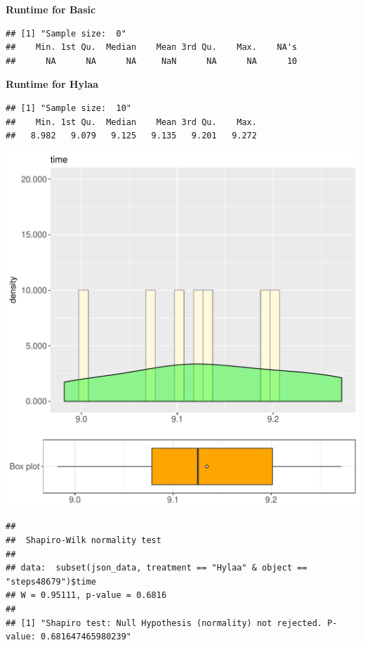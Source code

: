 \documentclass{article}\usepackage[]{graphicx}\usepackage[]{color}
\makeatletter
\def\maxwidth{ %
  \ifdim\Gin@nat@width>\linewidth
    \linewidth
  \else
    \Gin@nat@width
  \fi
}
\newenvironment{kframe}{%
 \def\at@end@of@kframe{}%
 \ifinner\ifhmode%
  \def\at@end@of@kframe{\end{minipage}}%
  \begin{minipage}{\columnwidth}%
 \fi\fi%
 \def\FrameCommand##1{\hskip\@totalleftmargin \hskip-\fboxsep
 \colorbox{shadecolor}{##1}\hskip-\fboxsep
     \hskip-\linewidth \hskip-\@totalleftmargin \hskip\columnwidth}%
 \MakeFramed {\advance\hsize-\width
   \@totalleftmargin\z@ \linewidth\hsize
   \@setminipage}}%
 {\par\unskip\endMakeFramed%
 \at@end@of@kframe}
\newenvironment{knitrout}{}{} %
\makeatother
\begin{document}
 \textbf{Runtime for Basic}
\begin{knitrout}
\color{fgcolor}\begin{kframe}
\begin{verbatim}
## [1] "Sample size:  0"
##    Min. 1st Qu.  Median    Mean 3rd Qu.    Max.    NA's 
##      NA      NA      NA     NaN      NA      NA      10
\end{verbatim}
\end{kframe}
\end{knitrout}
 \textbf{Runtime for Hylaa}
\begin{knitrout}
\color{fgcolor}\begin{kframe}
\begin{verbatim}
## [1] "Sample size:  10"
##    Min. 1st Qu.  Median    Mean 3rd Qu.    Max. 
##   8.982   9.079   9.125   9.135   9.201   9.272
\end{verbatim}
\end{kframe}
\includegraphics[width=\maxwidth]{figure/RH3_Hylaa_steps48679-1} 
\begin{kframe}\begin{verbatim}
## 
## 	Shapiro-Wilk normality test
## 
## data:  subset(json_data, treatment == "Hylaa" & object == "steps48679")$time
## W = 0.95111, p-value = 0.6816
## 
## [1] "Shapiro test: Null Hypothesis (normality) not rejected. P-value: 0.681647465980239"
\end{verbatim}
\end{kframe}
\end{knitrout}
  
\end{document}
